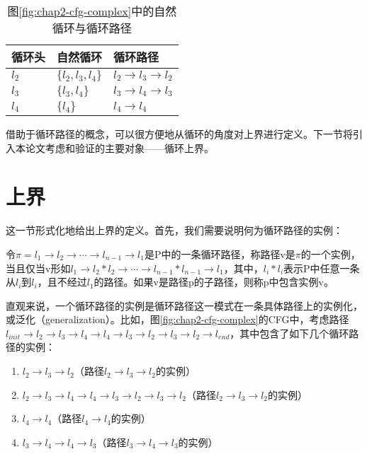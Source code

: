 \begin{table}
  \centering
  \begin{tabular}{lll}
    \toprule
    循环头 & 自然循环 & 循环路径\\
    \midrule
    $l_2$ & $\{l_2, l_3, l_4\}$ & $l_2 \rightarrow l_3 \rightarrow l_2$\\
    $l_3$ & $\{l_3, l_4\}$ & $l_3 \rightarrow l_4 \rightarrow l_3$\\
    $l_4$ & $\{l_4\}$ & $l_4 \rightarrow l_4$\\
    \bottomrule
  \end{tabular}
  \caption{图\ref{fig:chap2-cfg-complex}中的自然循环与循环路径}
  \label{tab:chap2-loop-path}
\end{table}

借助于循环路径的概念，可以很方便地从循环的角度对上界进行定义。下一节将引入本论文考虑和验证的主要对象——循环上界。

\section{上界}

这一节形式化地给出上界的定义。首先，我们需要说明何为循环路径的实例：

\begin{definition}
  令$\pi = l_1 \rightarrow l_2 \rightarrow \cdots \rightarrow l_{n - 1}
  \rightarrow
  l_1$是P中的一条循环路径，称路径v是$\pi$的一个实例，当且仅当v形如$l_1
  \rightarrow l_2 \ast l_2 \rightarrow \cdots \rightarrow l_{n - 1} \ast l_{n
  - 1} \rightarrow l_1$，其中，$l_i \ast
  l_i$表示P中任意一条从$l_i$到$l_i$，且不经过$l_1$的路径。如果v是路径p的子路径，则称p中包含实例v。
\end{definition}

直观来说，一个循环路径的实例是循环路径这一模式在一条具体路径上的实例化，或泛化（generalization）。比如，图\ref{fig:chap2-cfg-complex}的CFG中，考虑路径$l_{init} \rightarrow l_2 \rightarrow l_3 \rightarrow l_4 \rightarrow l_4 \rightarrow l_3 \rightarrow l_2 \rightarrow l_3 \rightarrow l_2 \rightarrow l_{end}$，其中包含了如下几个循环路径的实例：

\begin{enumerate}
    \item $l_2 \rightarrow l_3 \rightarrow l_2$（路径$l_2 \rightarrow l_3 \rightarrow l_2$的实例）
    \item $l_2 \rightarrow l_3 \rightarrow l_4 \rightarrow l_4 \rightarrow l_3 \rightarrow l_2 \rightarrow l_3 \rightarrow l_2$（路径$l_2 \rightarrow l_3 \rightarrow l_2$的实例）
    \item $l_4 \rightarrow l_4$（路径$l_4 \rightarrow l_4$的实例）
    \item $l_3 \rightarrow l_4 \rightarrow l_4 \rightarrow l_3$（路径$l_3 \rightarrow l_4 \rightarrow l_3$的实例）
\end{enumerate}

